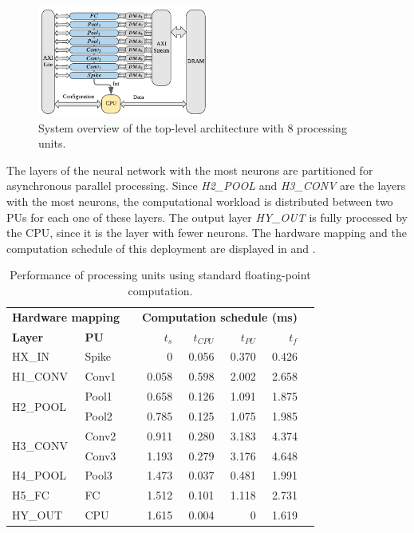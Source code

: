 \begin{figure}[h!]
	\centering
	\includegraphics[width=0.5\textwidth]{../figures/sbs_hw_experimental.pdf}
	\caption{System overview of the top-level architecture with 8 processing units.}
	\label{fig:hw_sbs_8_pu}
\end{figure}

The layers of the neural network with the most neurons are partitioned for asynchronous parallel processing. Since \emph{H2\_POOL} and \emph{H3\_CONV} are the layers with the most neurons, the computational workload is distributed between two PUs for each one of these layers. The output layer \emph{HY\_OUT} is fully processed by the CPU, since it is the layer with fewer neurons. The hardware mapping and the computation schedule of this deployment are displayed in  and .

\begin{table}[!t]\centering
	\caption{Performance of processing units using standard floating-point computation.}\label{tab:latency_fp}
	\scriptsize
	\begin{tabular}{llrrrrrr}\toprule
		\multicolumn{2}{c}{\textbf{Hardware mapping}} & &\multicolumn{4}{c}{\textbf{Computation schedule (ms)}} \\\cmidrule{1-2}\cmidrule{4-7}
		\textbf{Layer} &\textbf{PU} & &$t_s$ &$t_{CPU}$ &$t_{PU}$ &$t_f$ \\\midrule
		HX\_IN &Spike & &0 &0.056 &0.370 &0.426 \\
		H1\_CONV &Conv1 & &0.058 &0.598 &2.002 &2.658 \\
		\multirow{2}{*}{H2\_POOL}
		&Pool1 & &0.658 &0.126 &1.091 &1.875 \\
		&Pool2 & &0.785 &0.125 &1.075 &1.985 \\
		\multirow{2}{*}{H3\_CONV} 
		&Conv2 & &0.911 &0.280 &3.183 &4.374 \\
		&Conv3 & &1.193 &0.279 &3.176 &4.648 \\
		H4\_POOL &Pool3 & &1.473 &0.037 &0.481 &1.991 \\
		H5\_FC &FC & &1.512 &0.101 &1.118 &2.731 \\
		HY\_OUT &CPU & &1.615 &0.004 &0 &1.619 \\
		\bottomrule
	\end{tabular}
\end{table}

